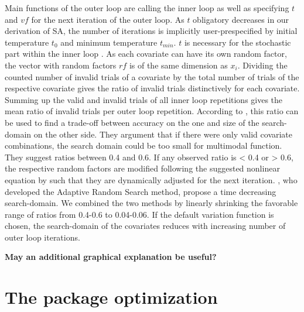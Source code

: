 Main functions of the outer loop are calling the inner loop as well as specifying $t$ and $vf$ for the next iteration of the outer loop. As $t$ obligatory decreases in our derivation of SA, the number of iterations is implicitly user-prespecified by initial temperature $t_0$ and minimum temperature $t_{min}$. $t$ is necessary for the stochastic part within the inner loop \citep{kirkpatrick_1983}. As each covariate can have its own random factor, the vector with random factors $rf$ is of the same dimension as $x_i$. Dividing the counted number of invalid trials of a covariate by the total number of trials of the respective covariate gives the ratio of invalid trials distinctively for each covariate. Summing up the valid and invalid trials of all inner loop repetitions gives the mean ratio of invalid trials per outer loop repetition. According to \citep{corana_1987}, this ratio can be used to find a trade-off between accuracy on the one and size of the search-domain on the other side. They argument that if there were only valid covariate combinations, the search domain could be too small for multimodal function. They suggest ratios between 0.4 and 0.6. If any observed ratio is < 0.4 or > 0.6, the respective random factors are modified following the suggested nonlinear equation by \citet{corana_1987} such that they are dynamically adjusted for the next iteration. \citet{pronzato_1984}, who developed the Adaptive Random Search method, propose a time decreasing search-domain. We combined the two methods by linearly shrinking the favorable range of ratios from 0.4-0.6 to 0.04-0.06. If the default variation function is chosen, the search-domain of the covariates reduces with increasing number of outer loop iterations.

\textbf{May an additional graphical explanation be useful?}

\section{The package optimization}

